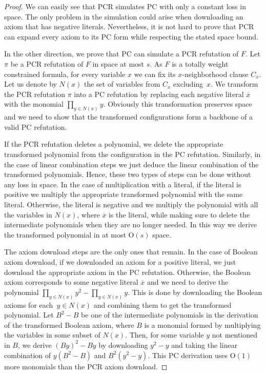 \documentclass[11pt]{article}
\numberwithin{equation}{section}
\theoremstyle{definition}
\theoremstyle{plain}
\theoremstyle{plain}
\theoremstyle{definition}
\newcommand{\bigoh}[1]{\mathrm{O} ( #1 )}
\newcommand{\olnot}[1]{\overline{#1}}
\newcommand{\varweightconstrained}{totally weight constrained\xspace}
\newcommand{\varneighborhoodclause}[1]{$#1$-neighborhood clause}
\newcommand{\varneighbors}[1]{N(#1)}
\newcommand{\booleanaxiompartial}{B}
\begin{document}
\begin{proof}
  We can easily see that PCR simulates PC with only a constant loss in
  space. The only problem in the simulation could arise when
  downloading an axiom that has negative literals. Nevertheless, it is
  not hard to prove that PCR can expand every axiom to its PC form
  while respecting the stated space bound.

  In the other direction, we prove that PC can simulate a PCR
  refutation of $F$. Let $\pi$ be a PCR refutation of $F$ in space at
  most $s$. As $F$ is a \varweightconstrained{} formula, for every
  variable $x$ we can fix its \varneighborhoodclause{x} $C_x$. Let us
  denote by $\varneighbors{x}$ the set of variables from $C_x$
  excluding~$x$. We transform the PCR refutation $\pi$ into a PC
  refutation by replacing each negative literal $\olnot{x}$ with the
  monomial $\prod_{y \in \varneighbors{x}} y$. Obviously this
  transformation preserves space and we need to show that the
  transformed configurations form a backbone of a valid PC refutation.

  If the PCR refutation deletes a polynomial, we delete the
  appropriate transformed polynomial from the configuration in the
  PC refutation. Similarly, in the case of linear combination steps we
  just deduce the linear combination of the transformed
  polynomials. Hence, these two types of steps can be done without any
  loss in space. In the case of multiplication with a literal, if the
  literal is positive we multiply the appropriate transformed
  polynomial with the same literal. Otherwise, the literal is negative
  and we multiply the polynomial with all the variables in
  $\varneighbors{x}$, where $\olnot{x}$ is the literal, while making
  sure to delete the intermediate polynomials when they are no longer
  needed. In this way we derive the transformed polynomial in at most
  $\bigoh{s}$ space.

  The axiom download steps are the only ones that remain. In the case
  of Boolean axiom download, if we downloaded an axiom for a positive
  literal, we just download the appropriate axiom in the PC
  refutation. Otherwise, the Boolean axiom corresponds to some
  negative literal $\olnot{x}$ and we need to derive the polynomial
  $\prod_{y \in \varneighbors{x}} y^2 - \prod_{y \in \varneighbors{x}}
  y$. This is done by downloading the Boolean axioms for each~$y \in
  \varneighbors{x}$ and combining them to get the transformed
  polynomial. Let $\booleanaxiompartial^2 - \booleanaxiompartial$ be
  one of the intermediate polynomials in the derivation of the
  transformed Boolean axiom, where $\booleanaxiompartial$ is a
  monomial formed by multiplying the variables in some subset of
  $\varneighbors{x}$. Then, for some variable $y$ not mentioned in
  $\booleanaxiompartial$, we derive $(\booleanaxiompartial y)^2 -
  \booleanaxiompartial y$ by downloading $y^2 - y$ and taking the
  linear combination of $y(\booleanaxiompartial^2 -
  \booleanaxiompartial)$ and $\booleanaxiompartial^2(y^2 - y)$. This
  PC derivation uses $\bigoh{1}$ more monomials than the PCR axiom
  download.


\end{proof}
\end{document}
